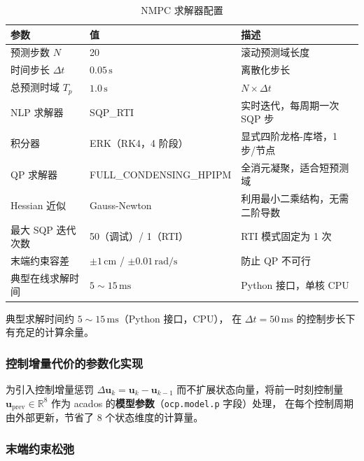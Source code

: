 \begin{table}[h]
\centering
\caption{NMPC 求解器配置}
\label{tab:solver}
\begin{tabular}{lll}
\toprule
\textbf{参数} & \textbf{值} & \textbf{描述} \\
\midrule
预测步数 $N$              & 20                          & 滚动预测域长度 \\
时间步长 $\Delta t$       & $0.05\,\mathrm{s}$          & 离散化步长 \\
总预测时域 $T_p$          & $1.0\,\mathrm{s}$           & $N \times \Delta t$ \\
NLP 求解器                & SQP\_RTI                    & 实时迭代，每周期一次 SQP 步 \\
积分器                    & ERK（RK4，4 阶段）           & 显式四阶龙格-库塔，1 步/节点 \\
QP 求解器                 & FULL\_CONDENSING\_HPIPM     & 全消元凝聚，适合短预测域 \\
Hessian 近似              & Gauss-Newton                & 利用最小二乘结构，无需二阶导数 \\
最大 SQP 迭代次数         & 50（调试）/ 1（RTI）         & RTI 模式固定为 1 次 \\
末端约束容差              & $\pm 1\,\mathrm{cm}$ / $\pm 0.01\,\mathrm{rad/s}$ & 防止 QP 不可行 \\
典型在线求解时间           & $5\sim15\,\mathrm{ms}$      & Python 接口，单核 CPU \\
\bottomrule
\end{tabular}
\end{table}

典型求解时间约 $5\sim 15\,\mathrm{ms}$（Python 接口，CPU），
在 $\Delta t = 50\,\mathrm{ms}$ 的控制步长下有充足的计算余量。

\subsubsection{控制增量代价的参数化实现}

为引入控制增量惩罚 $\Delta\mathbf{u}_k = \mathbf{u}_k - \mathbf{u}_{k-1}$
而不扩展状态向量，将前一时刻控制量 $\mathbf{u}_{\mathrm{prev}}\in\mathbb{R}^8$
作为 acados 的\textbf{模型参数}（\texttt{ocp.model.p} 字段）处理，
在每个控制周期由外部更新，节省了 8 个状态维度的计算量。

\subsubsection{末端约束松弛}

